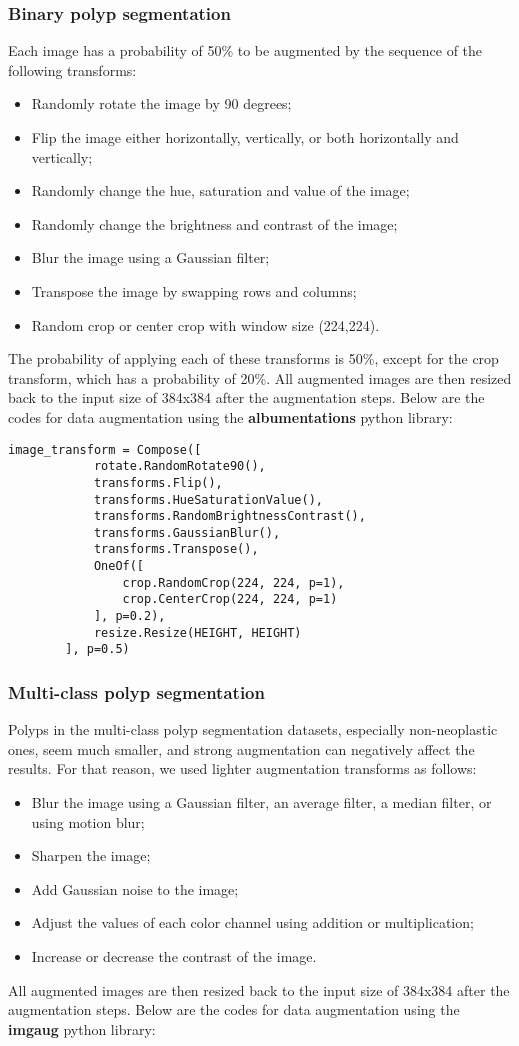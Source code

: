 \documentclass{article}
\begin{document}
\subsubsection{Binary polyp segmentation}
Each image has a probability of 50\% to be augmented by the sequence of the following transforms:
\begin{itemize}  
\item  Randomly rotate the image by 90 degrees;
\item Flip the image either horizontally, vertically, or both horizontally and vertically;
\item  Randomly change the hue, saturation and value of the image;
\item  Randomly change the brightness and contrast of the image;
\item  Blur the image using a Gaussian filter;
\item  Transpose the image by swapping rows and columns;
\item  Random crop or center crop with window size (224,224). 
\end{itemize}

The probability of applying each of these transforms is 50\%, except for the crop transform, which has a probability of 20\%. All augmented images are then resized back to the input size of 384x384 after the augmentation steps. Below are the codes for data augmentation using the \textbf{albumentations} python library:
\begin{lstlisting}
image_transform = Compose([
            rotate.RandomRotate90(),
            transforms.Flip(),
            transforms.HueSaturationValue(),
            transforms.RandomBrightnessContrast(),
            transforms.GaussianBlur(),
            transforms.Transpose(),
            OneOf([
                crop.RandomCrop(224, 224, p=1),
                crop.CenterCrop(224, 224, p=1)
            ], p=0.2),
            resize.Resize(HEIGHT, HEIGHT)
        ], p=0.5)
\end{lstlisting}
\subsubsection{Multi-class polyp segmentation}
Polyps in the multi-class polyp segmentation datasets, especially non-neoplastic ones, seem much smaller, and strong augmentation can negatively affect the results. For that reason, we used lighter augmentation transforms as follows:
\begin{itemize}
\item Blur the image using a Gaussian filter, an average filter, a median filter, or using motion blur;
\item Sharpen the image;
\item Add Gaussian noise to the image;
\item Adjust the values of each color channel using addition or multiplication;
\item Increase or decrease the contrast of the image.
\end{itemize}
All augmented images are then resized back to the input size of 384x384 after the augmentation steps. Below are the codes for data augmentation using the \textbf{imgaug} python library:
\end{document}
